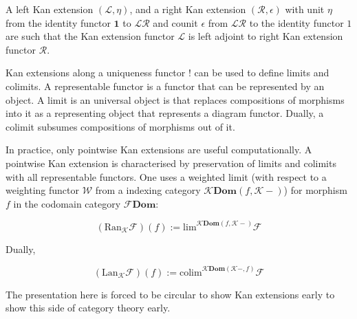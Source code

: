 \documentclass[10pt]{article}
\begin{document}
A left Kan extension $(\mathcal{L}, \eta)$, and a right Kan extension $(\mathcal{R}, \epsilon)$ with unit $\eta$ from the identity functor $\mathbf{1}$ to $\mathcal{L} \mathcal{R}$ and counit $\epsilon$ from $\mathcal{L} \mathcal{R}$ to the identity functor $\mathcal{1}$ are such that the Kan extension functor $\mathcal{L}$ is left adjoint to right Kan extension functor $\mathcal{R}$.

Kan extensions along a uniqueness functor $\mathbf{!}$ can be used to define limits and colimits. A representable functor is a functor that can be represented by an object. A limit is an universal object is that replaces compositions of morphisms into it as a representing object that represents a diagram functor. Dually, a colimit subsumes compositions of morphisms out of it.

In practice, only pointwise Kan extensions are useful computationally. A pointwise Kan extension is characterised by preservation of limits and colimits with all representable functors. One uses a weighted limit (with respect to a weighting functor $\mathcal{W}$ from a indexing category $\mathcal{K} \mathbf{Dom}(f, \mathcal{K}-)$) for morphism $f$ in the codomain category $\mathcal{F} \mathbf{Dom}$:

\begin{equation}
    (\mathrm{Ran}_\mathcal{K} \mathcal{F})(f)
    :=
    \mathrm{lim}^{\mathcal{K} \mathbf{Dom}(f, \mathcal{K}-)} \mathcal{F}
\end{equation}

Dually,

\begin{equation}
    (\mathrm{Lan}_\mathcal{K} \mathcal{F})(f)
    :=
    \mathrm{colim}^{\mathcal{K} \mathbf{Dom}(\mathcal{K}-, f)} \mathcal{F}
\end{equation}

The presentation here is forced to be circular to show Kan extensions early to show this side of category theory early.
\end{document}
